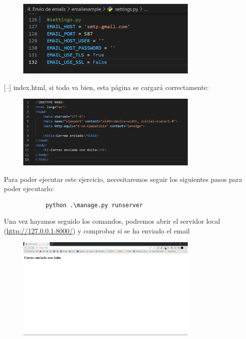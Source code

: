 \documentclass{article}
\begin{document}
\begin{enumerate}
\begin{description}
			\begin{figure}[H]
				\centering
				\includegraphics[width=0.8\textwidth,keepaspectratio]{img/Ejercicio4/settings.png}
			\end{figure}
			[--] index.html, si todo va bien, esta página se cargará correctamente:
			\begin{figure}[H]
				\centering
				\includegraphics[width=0.8\textwidth,keepaspectratio]{img/Ejercicio4/index.png}
			\end{figure}
		\end{description}
		Para poder ejecutar este ejercicio, necesitaremos seguir los siguientes pasos para poder ejecutarlo:
		\begin{lstlisting}
			python .\manage.py runserver
		\end{lstlisting}
		Una vez hayamos seguido los comandos, podremos abrir el servidor local (\url{http://127.0.0.1:8000/}) y comprobar si se ha enviado el email
		\begin{figure}[H]
			\centering
			\includegraphics[width=0.8\textwidth,keepaspectratio]{img/Ejercicio4/email-page.png}

\end{figure}
\end{enumerate}
\end{document}
